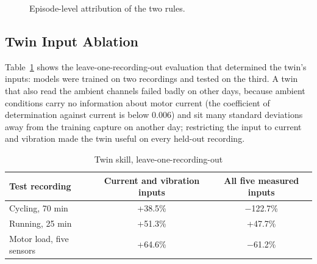 \documentclass[11pt,a4paper]{article}
\begin{document}
\begin{figure}[H]
\centering
{}
\caption{Episode-level attribution of the two rules.}
\label{fig:attribcompare}
\end{figure}

\subsection{Twin Input Ablation}

Table~\ref{tab:loco} shows the leave-one-recording-out evaluation that determined the twin's inputs: models were trained on two recordings and tested on the third. A twin that also read the ambient channels failed badly on other days, because ambient conditions carry no information about motor current (the coefficient of determination against current is below 0.006) and sit many standard deviations away from the training capture on another day; restricting the input to current and vibration made the twin useful on every held-out recording.

\begin{table}[H]
\centering
\caption{Twin skill, leave-one-recording-out}
\label{tab:loco}
\small
\begin{tabularx}{\textwidth}{@{}X c c@{}}
\toprule
\textbf{Test recording} & \textbf{Current and vibration inputs} & \textbf{All five measured inputs} \\
\midrule
Cycling, 70 min & +38.5\% & $-$122.7\% \\
Running, 25 min & +51.3\% & +47.7\% \\
Motor load, five sensors & +64.6\% & $-$61.2\% \\
\bottomrule
\end{tabularx}
\end{table}
\end{document}
